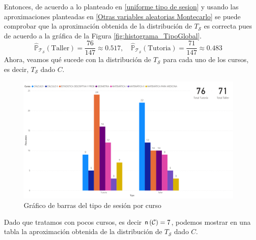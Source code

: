 \documentclass[11pt,a4paper]{book}
\theoremstyle{definition}%
\newcommand{\Probsymb}{\mathds{P}}
\newcommand{\card}[1]{\text{\textsf{n}}\left( #1 \right)}
\begin{document}
                Entonces, de acuerdo a lo planteado en \ref{uniforme tipo de sesion} y usando las aproximaciones planteadas en \ref{Otras variables aleatorias Montecarlo} se puede comprobar que la aproximación obtenida de la distribución de $T_\mathcal{S}$ es correcta pues de acuerdo a la gráfica de la Figura \ref{fig:histograma_TipoGlobal}.
                \begin{equation}
                    \hat{\Probsymb}_{\mathcal{T}_\mathcal{S}}(\text{Taller}) = \frac{76}{147} \approx 0.517, \quad \hat{\Probsymb}_{\mathcal{T}_\mathcal{S}}(\text{Tutoria}) = \frac{71}{147} \approx 0.483
                \end{equation}
                Ahora, veamos qué sucede con la distribución de $T_\mathcal{S}$ para cada uno de los cursos, es decir, $T_\mathcal{S}$ dado $C$.
                \begin{figure}[H]
                    \centering
                    \includegraphics[width=1\textwidth]{Sources/histograma_TipoCurso.png}
                    \caption{Gráfico de barras del tipo de sesión por curso}
                    \label{fig:histograma_TipoCurso}
                \end{figure}
                Dado que tratamos con pocos cursos, es decir $\card{\mathcal{C}}=7$, podemos mostrar en una tabla la aproximación obtenida de la distribución de $T_\mathcal{S}$ dado $C$.
\end{document}
